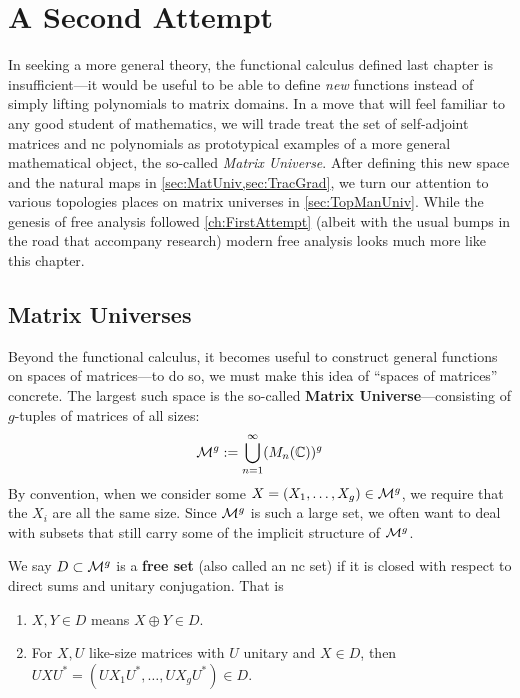 \chapter{A Second Attempt}\label{ch:SecondAttempt}

In seeking a more general theory, the functional calculus defined last chapter
is insufficient---it would be useful to be able to define \emph{new} functions
instead of simply lifting polynomials to matrix domains. In a move that will
feel familiar to any good student of mathematics, we will trade treat the
set of self-adjoint matrices and nc polynomials
as prototypical examples of a more general mathematical
object, the so-called \emph{Matrix Universe}.
After defining this new space and the natural maps in
\cref{sec:MatUniv,sec:TracGrad}, we turn our attention to various topologies
places on matrix universes in \cref{sec:TopManUniv}. While the genesis of free
analysis followed \cref{ch:FirstAttempt} (albeit with the usual bumps in the
road that accompany research) modern free analysis looks much more like this
chapter.

\section{Matrix Universes}%
\label{sec:MatUniv}

Beyond the functional calculus, it becomes useful to construct general functions
on spaces of matrices---to do so, we must make this idea of ``spaces of
matrices'' concrete. The largest such space is the so-called \textbf{Matrix
  Universe}---consisting of \(g\)-tuples of matrices of all sizes:
\[
  \mathcal{M}^g := \bigcup_{n=1}^\infty (M_n(\mathbb{C}))^g
\]
By convention, when we consider some
\(X = \left( X_1, \dots , X_g \right) \in \mathcal{M}^g\), we require that the \(X_i\)
are all the same size. Since \(\mathcal{M}^g\) is such a large set, we often want to
deal with subsets that still carry some of the implicit structure of \(\mathcal{M}^g\).
\begin{definition}
  \label{def:FreeSet}
  We say \(D \subset \mathcal{M}^g\) is a \textbf{free set} (also called an nc set) if it is closed with respect
  to direct sums and unitary conjugation. That is
  \begin{enumerate}
    \item \(X,Y \in D \) means \(X\oplus Y \in D\).
    \item For \(X,U\) like-size matrices with \(U\) unitary and \(X \in D\),
          then \(U X U^* = \left( UX_1U^*, \dots , UX_g U^*  \right) \in D \).
  \end{enumerate}
\end{definition}

